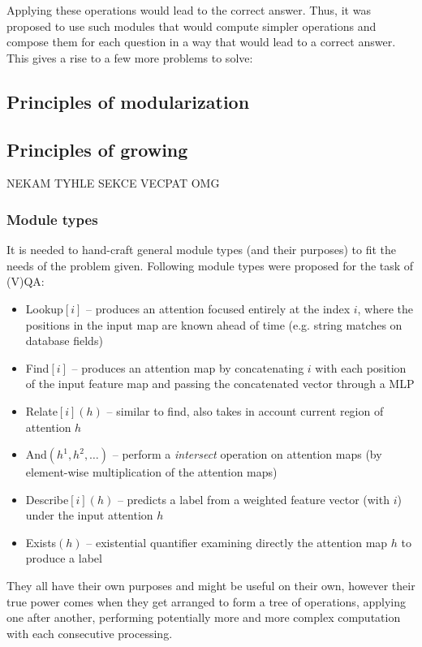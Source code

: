 \documentclass[a4paper,twocolumn]{article}
\begin{document}
Applying these operations would lead to the correct answer. Thus, it was proposed to use such modules that would compute simpler operations and compose them for each question in a way that would lead to a correct answer. This gives a rise to a few more problems to solve:

\subsection*{Principles of modularization}
\subsection*{Principles of growing}
NEKAM TYHLE SEKCE VECPAT OMG
\subsubsection*{Module types}
It is needed to hand-craft general module types (and their purposes) to fit the needs of the problem given. Following module types were proposed for the task of (V)QA:
    \begin{itemize}
        \item Lookup$[i]$ – produces an attention focused entirely at the index $i$, where the positions in the input map are known ahead of time (e.g. string matches on database fields)
        \item Find$[i]$ – produces an attention map by concatenating $i$ with each position of the input feature map and passing the concatenated vector through a MLP
        \item Relate$[i](h)$ – similar to find, also takes in account current region of attention $h$
        \item And$(h^1, h^2, \dots)$ – perform a \textit{intersect} operation on attention maps (by element-wise multiplication of the attention maps)
        \item Describe$[i](h)$ – predicts a label from a weighted feature vector (with $i$) under the input attention $h$
        \item Exists$(h)$ – existential quantifier examining directly the attention map $h$ to produce a label
    \end{itemize}
They all have their own purposes and might be useful on their own, however their true
power comes when they get arranged to form a tree of operations, applying one after another, performing potentially more and more complex computation with each consecutive processing.
\end{document}

